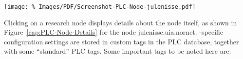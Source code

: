 \begin{figure*}
\begin{center}
\texttt{[image: \%
   Images/PDF/Screenshot-PLC-Node-julenisse.pdf]}
\end{center}
\caption{Nodes $\rightarrow$ Node julenisse.uia.nornet}
\label{cap:PLC-Node-Details}
\end{figure*}

Clicking on a research node displays details about the node itself, as shown in Figure~\ref{cap:PLC-Node-Details} for the node julenisse.uia.nornet. -specific configuration settings are stored in custom tags in the PLC database, together with some ``standard'' PLC tags. Some important tags to be noted here are:
